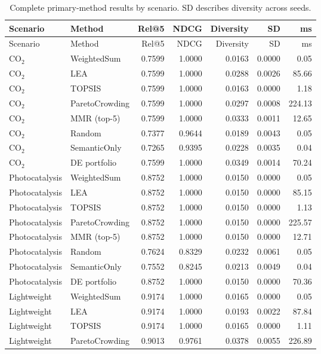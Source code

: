 \documentclass[11pt,a4paper]{article}
\begin{document}
\begin{footnotesize}\begin{longtable}{llrrrrr}
\caption{Complete primary-method results by scenario. SD describes diversity across seeds.}\label{tab:scenario}\\
\toprule
Scenario & Method & Rel@5 & NDCG & Diversity & SD & ms\\\midrule\endfirsthead
\toprule Scenario & Method & Rel@5 & NDCG & Diversity & SD & ms\\\midrule\endhead
CO$_2$ & WeightedSum & 0.7599 & 1.0000 & 0.0163 & 0.0000 & 0.05\\
CO$_2$ & LEA & 0.7599 & 1.0000 & 0.0288 & 0.0026 & 85.66\\
CO$_2$ & TOPSIS & 0.7599 & 1.0000 & 0.0163 & 0.0000 & 1.18\\
CO$_2$ & ParetoCrowding & 0.7599 & 1.0000 & 0.0297 & 0.0008 & 224.13\\
CO$_2$ & MMR (top-5) & 0.7599 & 1.0000 & 0.0333 & 0.0011 & 12.65\\
CO$_2$ & Random & 0.7377 & 0.9644 & 0.0189 & 0.0043 & 0.05\\
CO$_2$ & SemanticOnly & 0.7265 & 0.9395 & 0.0228 & 0.0035 & 0.04\\
CO$_2$ & DE portfolio & 0.7599 & 1.0000 & 0.0349 & 0.0014 & 70.24\\
Photocatalysis & WeightedSum & 0.8752 & 1.0000 & 0.0150 & 0.0000 & 0.05\\
Photocatalysis & LEA & 0.8752 & 1.0000 & 0.0150 & 0.0000 & 85.15\\
Photocatalysis & TOPSIS & 0.8752 & 1.0000 & 0.0150 & 0.0000 & 1.13\\
Photocatalysis & ParetoCrowding & 0.8752 & 1.0000 & 0.0150 & 0.0000 & 225.57\\
Photocatalysis & MMR (top-5) & 0.8752 & 1.0000 & 0.0150 & 0.0000 & 12.71\\
Photocatalysis & Random & 0.7624 & 0.8329 & 0.0232 & 0.0061 & 0.05\\
Photocatalysis & SemanticOnly & 0.7552 & 0.8245 & 0.0213 & 0.0049 & 0.04\\
Photocatalysis & DE portfolio & 0.8752 & 1.0000 & 0.0150 & 0.0000 & 70.36\\
Lightweight & WeightedSum & 0.9174 & 1.0000 & 0.0165 & 0.0000 & 0.05\\
Lightweight & LEA & 0.9174 & 1.0000 & 0.0193 & 0.0022 & 87.84\\
Lightweight & TOPSIS & 0.9174 & 1.0000 & 0.0165 & 0.0000 & 1.11\\
Lightweight & ParetoCrowding & 0.9013 & 0.9761 & 0.0378 & 0.0055 & 226.89\\

\end{longtable}
\end{footnotesize}
\end{document}
